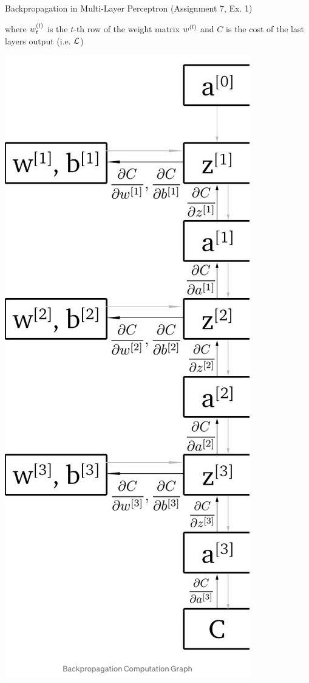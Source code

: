 \begin{highlight}{Backpropagation in Multi-Layer Perceptron (Assignment 7, Ex. 1)}
\begin{minipage}{0.5\columnwidth}
where
$w^{(l)}_t$ is the $t$-th row of the weight matrix $w^{(l)}$ and $C$ is the cost of the last layers output (i.e. $\mathcal L$)
\end{minipage}
\begin{minipage}{0.5\columnwidth}
	\begin{flushright}
		\includegraphics[width=0.8\columnwidth]{images/10-backpropagation}
	\end{flushright}
\end{minipage}
\end{highlight}

